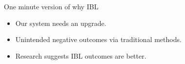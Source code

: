 \documentclass[10pt,handout]{beamer}
\begin{document}



\begin{frame}

\vfill
\begin{center}
\end{center}
\vfill

\end{frame}


\begin{frame}

\begin{block}{One minute version of why IBL}
\begin{itemize}
\item<2-> Our system needs an upgrade.
\item<3-> Unintended negative outcomes via traditional methods.
\item<4-> Research suggests IBL outcomes are better.
\end{itemize}
\end{block}

\vspace{1em}


\end{frame}

\end{document}
